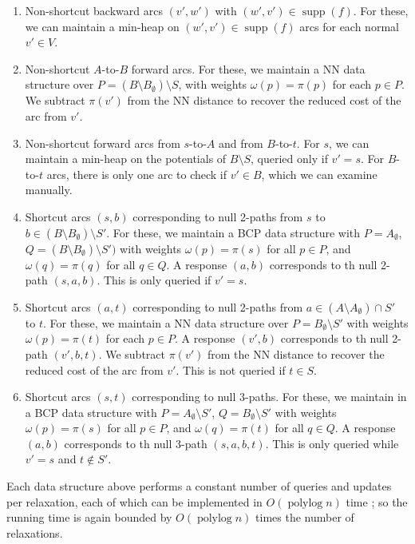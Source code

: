 \documentclass[a4paper,UKenglish]{socg-lipics-v2018}
\def\polylog{\mathop{\mathrm{polylog}}}
\def\supp{\operatorname{supp}}
\theoremstyle{plain}
\numberwithin{figure}{section}
\begin{document}
\begin{enumerate}
\item Non-shortcut backward arcs $(v', w')$ with $(w', v') \in \supp(f)$.
	For these, we can maintain a min-heap on $(w', v') \in \supp(f)$ arcs
	for each normal $v' \in V$.
\item Non-shortcut $A$-to-$B$ forward arcs.
	For these, we maintain a NN data structure over
	$P = (B \setminus B_\emptyset) \setminus S$, with weights
	$\omega(p) = \pi(p)$ for each $p \in P$.
	We subtract $\pi(v')$ from the NN distance to recover the reduced cost
	of the arc from $v'$.
\item Non-shortcut forward arcs from $s$-to-$A$ and from $B$-to-$t$.
	For $s$, we can maintain a min-heap on the potentials of
	$B \setminus S$, queried only if $v' = s$.
	For $B$-to-$t$ arcs, there is only one arc to check if $v' \in B$,
	which we can examine manually.

\item Shortcut arcs $(s, b)$ corresponding to null 2-paths from $s$ to
	$b \in (B \setminus B_\emptyset) \setminus S'$.
	For these, we maintain a BCP data structure with $P = A_\emptyset$,
	$Q = (B \setminus B_\emptyset) \setminus S')$ with weights
	$\omega(p) = \pi(s)$ for all $p \in P$, and $\omega(q) = \pi(q)$ for
	all $q \in Q$.
	A response $(a, b)$ corresponds to th null 2-path $(s, a, b)$.
	This is only queried if $v' = s$.
\item Shortcut arcs $(a, t)$ corresponding to null 2-paths from
	$a \in (A \setminus A_\emptyset) \cap S'$ to $t$.
	For these, we maintain a NN data structure over
	$P = B_\emptyset \setminus S'$ with weights $\omega(p) = \pi(t)$ for
	each $p \in P$.
	A response $(v', b)$ corresponds to th null 2-path $(v', b, t)$.
	We subtract $\pi(v')$ from the NN distance to recover the reduced cost
	of the arc from $v'$.
	This is not queried if $t \in S$.
\item Shortcut arcs $(s, t)$ corresponding to null 3-paths.
	For these, we maintain in a BCP data structure with
	$P = A_\emptyset \setminus S'$, $Q = B_\emptyset \setminus S'$ with
	weights $\omega(p) = \pi(s)$ for all
	$p \in P$, and $\omega(q) = \pi(t)$ for all $q \in Q$.
	A response $(a, b)$ corresponds to th null 3-path $(s, a, b, t)$.
	This is only queried while $v' = s$ and $t \not\in S'$.
\end{enumerate}

Each data structure above performs a constant number of queries and
updates per relaxation, each of which can be implemented in $O(\polylog n)$ time \cite{}; so the running time is again bounded by
$O(\polylog n)$ times the number of relaxations.
\end{document}
